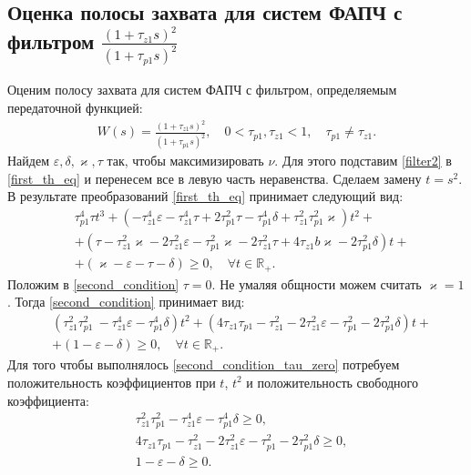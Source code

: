 \documentclass[a4paper,article,14pt]{extarticle}
\begin{document}
\subsection{Оценка полосы захвата для систем ФАПЧ с фильтром $\frac{(1+\tau_{z1}s)^2}{(1+\tau_{p1}s)^2}$}
Оценим полосу захвата для систем ФАПЧ с фильтром, определяемым передаточной функцией:
 \begin{equation}\label{filter2}
 \begin{aligned}
W(s) = \frac{(1+\tau_{z1}s)^2}{(1+\tau_{p1}s)^2}, \quad 0<\tau_{p1},\tau_{z1} < 1, \quad \tau_{p1} \neq \tau_{z1}.
 \end{aligned}
\end{equation}
Найдем $\varepsilon, \delta, \varkappa, \tau$ так, чтобы максимизировать $\nu$. Для этого подставим \eqref{filter2} в \eqref{first_th_eq} и перенесем все в левую часть неравенства. Сделаем замену $t = s^2$. В результате преобразований \eqref{first_th_eq} принимает следующий вид:
 \begin{equation}\label{second_condition}
 \begin{aligned}
&\tau_{p1}^4\tau t^3 +(- \tau_{z1}^4\varepsilon - \tau_{z1}^4\tau + 2\tau_{p1}^2\tau- \tau_{p1}^4\delta + \tau_{z1}^2\tau_{p1}^2\varkappa)t^2 +\\
&+( \tau- \tau_{z1}^2\varkappa - 2\tau_{z1}^2\varepsilon - \tau_{p1}^2\varkappa- 2\tau_{z1}^2\tau + 4\tau_{z1}b\varkappa- 2\tau_{p1}^2\delta)t + \\
&+ (\varkappa-\varepsilon - \tau - \delta)  \geqslant 0, \quad \forall t \in \mathbb{R_+}.
 \end{aligned}
\end{equation}
Положим в \eqref{second_condition} $\tau = 0$. Не умаляя общности можем считать $\varkappa = 1$. Тогда \eqref{second_condition} принимает вид:
 \begin{equation}\label{second_condition_tau_zero}
 \begin{aligned}
&(\tau_{z1}^2\tau_{p1}^2\ - \tau_{z1}^4\varepsilon - \tau_{p1}^4\delta)t^2 +( 4\tau_{z1}\tau_{p1} - \tau_{z1}^2 - 2\tau_{z1}^2\varepsilon - \tau_{p1}^2 - 2\tau_{p1}^2\delta)t + \\
&+ (1-\varepsilon - \delta)  \geqslant 0, \quad \forall t \in \mathbb{R_+}.
 \end{aligned}
\end{equation}
Для того чтобы выполнялось \eqref{second_condition_tau_zero} потребуем положительность коэффициентов при $t$, $t^2$ и положительность свободного коэффициента: 
 \begin{equation}\label{filter2_1_area}
 \begin{aligned}
&\tau_{z1}^2\tau_{p1}^2 - \tau_{z1}^4\varepsilon - \tau_{p1}^4\delta \geqslant 0,\\
&4\tau_{z1}\tau_{p1} - \tau_{z1}^2 - 2\tau_{z1}^2\varepsilon - \tau_{p1}^2 - 2\tau_{p1}^2\delta \geqslant 0,\\
&1-\varepsilon - \delta \geqslant 0.
 \end{aligned}
\end{equation}
\end{document}
